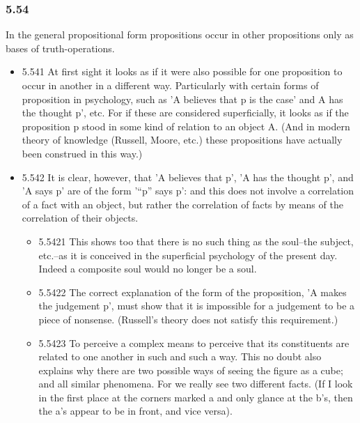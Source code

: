 \documentclass[11pt]{article}
\begin{document}
\subsubsection*{5.54}
\label{sec:org41433d0}
In the general propositional form propositions occur in other
propositions only as bases of truth-operations.
\begin{itemize}
\item 5.541
\label{sec:org656643c}
At first sight it looks as if it were also possible for one
proposition to occur in another in a different way. Particularly with
certain forms of proposition in psychology, such as 'A believes that p is
the case' and A has the thought p', etc. For if these are considered
superficially, it looks as if the proposition p stood in some kind of
relation to an object A. (And in modern theory of knowledge (Russell,
Moore, etc.) these propositions have actually been construed in this way.)
\item 5.542
\label{sec:org424f25e}
It is clear, however, that 'A believes that p', 'A has the thought
p', and 'A says p' are of the form '``p'' says p': and this does not involve
a correlation of a fact with an object, but rather the correlation of facts
by means of the correlation of their objects.
\begin{itemize}
\item 5.5421
\label{sec:orgaf0061b}
This shows too that there is no such thing as the soul--the subject,
etc.--as it is conceived in the superficial psychology of the present day.
Indeed a composite soul would no longer be a soul.
\item 5.5422
\label{sec:org1a333cb}
The correct explanation of the form of the proposition, 'A makes the
judgement p', must show that it is impossible for a judgement to be a piece
of nonsense. (Russell's theory does not satisfy this requirement.)
\item 5.5423
\label{sec:org7c2015b}
To perceive a complex means to perceive that its constituents are
related to one another in such and such a way. This no doubt also explains
why there are two possible ways of seeing the figure as a cube; and all
similar phenomena. For we really see two different facts. (If I look in the
first place at the corners marked a and only glance at the b's, then the
a's appear to be in front, and vice versa).
\end{itemize}
\end{itemize}
\end{document}
